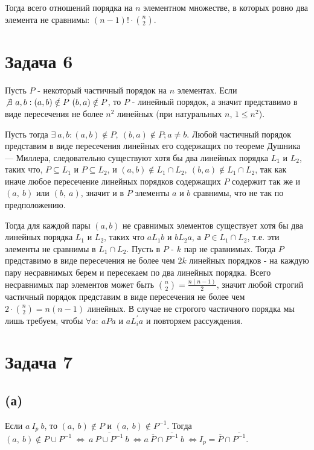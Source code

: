 \documentclass{article}
\begin{document}
	Тогда всего отношений порядка на $n$ элементном множестве, в которых ровно два элемента не сравнимы: $(n - 1)! \cdot {n \choose 2}$.
	
	\section{Задача 6}
	Пусть $P$ - некоторый частичный порядок на $n$ элементах. Если $\not \exists\ a, b: (a, b) \notin P \ (b, a) \notin P$, то $P$ - линейный порядок, а значит представимо в виде пересечения не более $n^2$ линейных (при натуральных $n$, $1 \leqslant n^2$).
	
	Пусть тогда $\exists\ a, b: (a, b) \notin P,\ (b, a) \notin P; a \ne b$. Любой частичный порядок представим в виде пересечения линейных его содержащих по теореме Душника — Миллера, следовательно существуют хотя бы два линейных порядка $L_1$ и $L_2$, таких что, $P \subseteq L_1$ и $P \subseteq L_2$, и $ (a, b) \notin L_1\cap L_2,\ (b, a) \notin L_1\cap L_2$, так как иначе любое пересечение линейных порядков содержащих $P$ содержит так же и $(a,\ b)$ или $(b,\ a)$, значит и в $P$ элементы $a$ и $b$ сравнимы, что не так по предположению. 
	
	Тогда для каждой пары $(a, b)$ не сравнимых элементов существует хотя бы два линейных порядка  $L_1$ и $L_2$, таких что $aL_1b$ и $bL_2a$, а $P \in L_1\cap L_2$, т.е. эти элементы не сравнимы в $L_1\cap L_2$. Пусть в $P$ - $k$ пар не сравнимых. Тогда $P$ представимо в виде пересечения не более чем $2k$ линейных порядков - на каждую пару несравнимых берем и пересекаем по два линейных порядка. Всего несравнимых пар элементов может быть ${n \choose 2} = \frac{n(n - 1)}{2}$, значит любой строгий частичный порядок представим в виде пересечения не более чем  $2\cdot {n \choose 2} = n(n - 1)$ линейных. В случае не строгого частичного порядка мы лишь требуем, чтобы $\forall a:\ aPa$ и $aL^{\prime}_ia$ и повторяем рассуждения.

	\section{Задача 7}
	
	\subsection {(а)}
	Если $a\ I_p\ b$, то $(a,\ b) \notin P$ и $(a,\ b) \notin P^{-1}$. Тогда $(a,\ b) \notin P \cup P^{-1}\ \Leftrightarrow\ a\ \overline{P \cup P^{-1}} \ b\ \Leftrightarrow a\ \overline{P} \cap \overline{P^{-1}} \ b\ \Leftrightarrow I_p = \overline{P} \cap \overline{P^{-1}}$.
	
\end{document}
